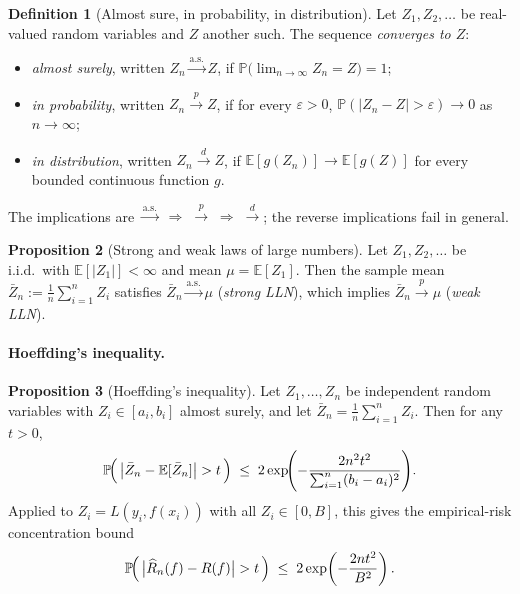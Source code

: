 \documentclass[11pt]{article}
\theoremstyle{definition}
\newtheorem{definition}{Definition}
\newtheorem{proposition}[definition]{Proposition}
\begin{document}
\begin{definition}[Almost sure, in probability, in distribution]
Let $Z_{1}, Z_{2}, \dots$ be real-valued random variables and $Z$ another
such. The sequence \emph{converges to $Z$}:
\begin{itemize}[leftmargin=2em]
  \item \emph{almost surely}, written $Z_n \xrightarrow{\text{a.s.}} Z$, if
        $\mathbb{P}\bigl(\lim_{n \to \infty} Z_n = Z\bigr) = 1$;
  \item \emph{in probability}, written $Z_n \xrightarrow{\;p\;} Z$, if for
        every $\varepsilon > 0$,
        $\mathbb{P}(|Z_n - Z| > \varepsilon) \to 0$ as $n \to \infty$;
  \item \emph{in distribution}, written $Z_n \xrightarrow{\;d\;} Z$, if
        $\mathbb{E}[g(Z_n)] \to \mathbb{E}[g(Z)]$ for every bounded
        continuous function $g$.
\end{itemize}
The implications are
$\xrightarrow{\text{a.s.}} \;\Rightarrow\; \xrightarrow{\;p\;} \;\Rightarrow\; \xrightarrow{\;d\;}$;
the reverse implications fail in general.
\end{definition}

\begin{proposition}[Strong and weak laws of large numbers]
Let $Z_1, Z_2, \dots$ be i.i.d.\ with $\mathbb{E}[|Z_1|] < \infty$ and mean
$\mu = \mathbb{E}[Z_1]$. Then the sample mean
$\bar{Z}_n := \tfrac{1}{n}\sum_{i=1}^n Z_i$ satisfies
$\bar{Z}_n \xrightarrow{\text{a.s.}} \mu$ (\emph{strong LLN}), which implies
$\bar{Z}_n \xrightarrow{\;p\;} \mu$ (\emph{weak LLN}).
\end{proposition}

\paragraph{Hoeffding's inequality.}

\begin{proposition}[Hoeffding's inequality]
Let $Z_{1}, \dots, Z_{n}$ be independent random variables with
$Z_{i} \in [a_{i}, b_{i}]$ almost surely, and let
$\bar{Z}_n = \tfrac{1}{n}\sum_{i=1}^n Z_i$. Then for any $t > 0$,
\[
  \mathbb{P}\!\Bigl(\,\bigl|\bar{Z}_n - \mathbb{E}[\bar{Z}_n]\bigr| > t \,\Bigr)
  \;\leq\; 2 \exp\!\Biggl(-\frac{2 n^{2} t^{2}}{\sum_{i=1}^n (b_i - a_i)^{2}}\Biggr).
\]
Applied to $Z_i = L(y_i, f(x_i))$ with all $Z_i \in [0, B]$, this gives the
empirical-risk concentration bound
\[
  \mathbb{P}\!\Bigl(\,\bigl|\widehat{R}_n(f) - R(f)\bigr| > t \,\Bigr)
  \;\leq\; 2 \exp\!\left(-\frac{2 n t^{2}}{B^{2}}\right).
\]
\end{proposition}
\end{document}
